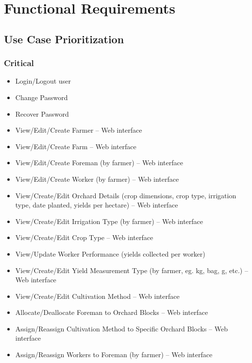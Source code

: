 \documentclass[11pt,fleqn]{book} %
\begin{document}
	
	
	\chapter{Functional Requirements}
	
	\section{Use Case Prioritization}
	\subsection{Critical}
	\begin{itemize}
		\item Login/Logout user
		\item Change Password
		\item Recover Password
		\item View/Edit/Create Farmer – Web interface
		\item View/Edit/Create Farm – Web interface
		\item View/Edit/Create Foreman (by farmer) – Web interface
		\item View/Edit/Create Worker (by farmer) – Web interface
		\item View/Create/Edit Orchard Details (crop dimensions, crop type, irrigation type, date planted, yields per hectare) – Web interface
		\item View/Create/Edit Irrigation Type (by farmer) – Web interface
		\item View/Create/Edit Crop Type – Web interface
		\item View/Update Worker Performance (yields collected per worker)
		\item View/Create/Edit Yield Measurement Type (by farmer, eg. kg, bag, g, etc.) – Web interface
		\item View/Create/Edit Cultivation Method – Web interface
		\item Allocate/Deallocate Foreman to Orchard Blocks – Web interface
		\item Assign/Reassign Cultivation Method to Specific Orchard Blocks – Web interface
		\item Assign/Reassign Workers to Foreman (by farmer) – Web interface
		
	\end{itemize}
	
\end{document}
